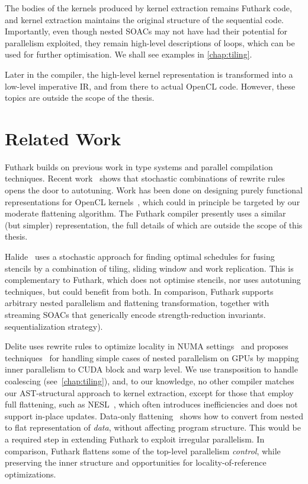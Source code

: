 The bodies of the kernels produced by kernel extraction remains
Futhark code, and kernel extraction maintains the original structure
of the sequential code.  Importantly, even though nested SOACs may not
have had their potential for parallelism exploited, they remain
high-level descriptions of loops, which can be used for further
optimisation.  We shall see examples in \cref{chap:tiling}.

Later in the compiler, the high-level kernel representation is
transformed into a low-level imperative IR, and from there to actual
OpenCL code.  However, these topics are outside the scope of the
thesis.

\section{Related Work}

Futhark builds on previous work in type systems and parallel
compilation techniques. Recent
work~\cite{Steuwer:2015:GPP:2858949.2784754} shows that stochastic
combinations of rewrite rules opens the door to autotuning.  Work has
been done on designing purely functional representations for OpenCL
kernels~\cite{Steuwer:2017:LFD:3049832.3049841}, which could in
principle be targeted by our moderate flattening algorithm.  The
Futhark compiler presently uses a similar (but simpler)
representation, the full details of which are outside the scope of
this thesis.

Halide~\cite{Halide} uses a stochastic approach for finding optimal
schedules for fusing stencils by a combination of tiling, sliding
window and work replication.  This is complementary to Futhark, which
does not optimise stencils, nor uses autotuning techniques, but could
benefit from both.  In comparison, Futhark supports arbitrary nested
parallelism and flattening transformation, together with streaming
SOACs that generically encode strength-reduction invariants.
sequentialization strategy).

Delite uses rewrite rules to optimize locality in NUMA
settings~\cite{DeliteNUMA} and proposes
techniques~\cite{DeliteNestedPar} for handling simple cases of nested
parallelism on GPUs by mapping inner parallelism to CUDA block and
warp level.  We use transposition to handle coalescing
(see~\cref{chap:tiling}), and, to our knowledge, no other compiler
matches our AST-structural approach to kernel extraction, except for
those that employ full flattening, such as
NESL~\cite{blelloch1994implementation,bergstrom2012nested}, which
often introduces inefficiencies and does not support in-place updates.
%
Data-only flattening~\cite{Bergstrom:2013:DFN:2442516.2442525} shows
how to convert from nested to flat representation of \textit{data},
without affecting program structure.  This would be a required step in
extending Futhark to exploit irregular parallelism.  In comparison,
Futhark flattens some of the top-level parallelism \textit{control},
while preserving the inner structure and opportunities for
locality-of-reference optimizations.

